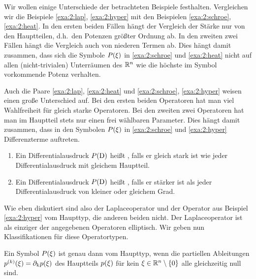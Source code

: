 Wir wollen einige Unterschiede der betrachteten Beispiele festhalten.
Vergleichen wir die Beispiele \ref{exa:2:lap}, \ref{exa:2:hyper}
mit den Beispielen \ref{exa:2:schroe}, \ref{exa:2:heat}.
In den ersten beiden Fällen hängt der Vergleich der Stärke nur von den Hauptteilen,
d.h.~den Potenzen größter Ordnung ab.
In den zweiten zwei Fällen hängt die Vergleich auch von niederen Termen ab.
Dies hängt damit zusammen, dass sich die Symbole $P(\xi)$ in
\ref{exa:2:schroe} und \ref{exa:2:heat} nicht auf allen (nicht-trivialen)
Unterräumen des $\mathbb R^n$ wie die höchste im Symbol vorkommende Potenz verhalten.

Auch die Paare \ref{exa:2:lap}, \ref{exa:2:heat}
und \ref{exa:2:schroe}, \ref{exa:2:hyper}
weisen einen große Unterschied auf.
Bei den ersten beiden Operatoren hat man viel Wahlfreiheit
für gleich starke Operatoren.
Bei den zweiten zwei Operatoren hat man im Hauptteil stets
nur einen frei wählbaren Parameter.
Dies hängt damit zusammen, dass in den Symbolen $P(\xi)$
in \ref{exa:2:schroe} und \ref{exa:2:hyper} Differenzterme auftreten.

\begin{df}
\begin{enumerate}
\item
Ein Differentialausdruck $P(\mathrm D)$ heißt ,
falls er gleich stark ist wie jeder Differentialausdruck mit gleichem Hauptteil.
\item
Ein Differentialausdruck $P(\mathrm D)$ heißt ,
falls er stärker ist als jeder Differentialausdruck von kleiner oder gleichem Grad.
\end{enumerate}
\end{df}

Wie eben diskutiert sind also der Laplaceoperator
und der Operator aus Beispiel \ref{exa:2:hyper} vom Haupttyp,
die anderen beiden nicht. Der Laplaceoperator ist als einziger der angegebenen Operatoren elliptisch.
Wir geben nun Klassifikationen für diese Operatortypen.

\begin{thm}\label{thm:2:2.9}
Ein Symbol $P(\xi)$ ist genau dann vom Haupttyp,
wenn die partiellen Ableitungen $p^{(k)}(\xi)=\partial_k p(\xi)$
des Hauptteils $p(\xi)$ für kein $\xi\in\mathbb R^n\setminus\{0\}$
alle gleichzeitig null sind.
\end{thm}

